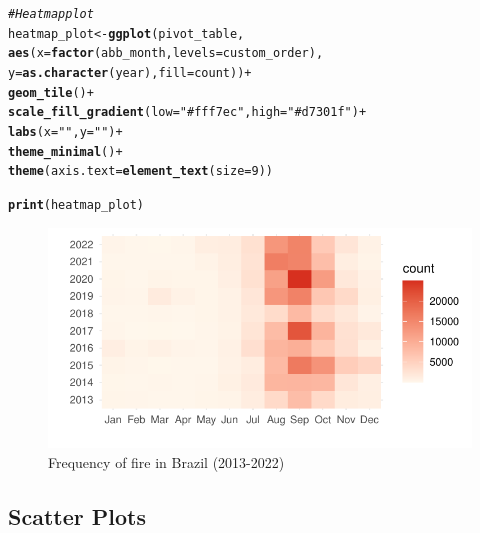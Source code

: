 \documentclass{article}\usepackage[]{graphicx}\usepackage[]{xcolor}
\makeatletter
\def\maxwidth{ %
  \ifdim\Gin@nat@width>\linewidth
    \linewidth
  \else
    \Gin@nat@width
  \fi
}
\newcommand{\hlnum}[1]{\textcolor[rgb]{0.686,0.059,0.569}{#1}}%
\newcommand{\hlstr}[1]{\textcolor[rgb]{0.192,0.494,0.8}{#1}}%
\newcommand{\hlcom}[1]{\textcolor[rgb]{0.678,0.584,0.686}{\textit{#1}}}%
\newcommand{\hlopt}[1]{\textcolor[rgb]{0,0,0}{#1}}%
\newcommand{\hlstd}[1]{\textcolor[rgb]{0.345,0.345,0.345}{#1}}%
\newcommand{\hlkwb}[1]{\textcolor[rgb]{0.69,0.353,0.396}{#1}}%
\newcommand{\hlkwc}[1]{\textcolor[rgb]{0.333,0.667,0.333}{#1}}%
\newcommand{\hlkwd}[1]{\textcolor[rgb]{0.737,0.353,0.396}{\textbf{#1}}}%
\newenvironment{kframe}{%
 \def\at@end@of@kframe{}%
 \ifinner\ifhmode%
  \def\at@end@of@kframe{\end{minipage}}%
  \begin{minipage}{\columnwidth}%
 \fi\fi%
 \def\FrameCommand##1{\hskip\@totalleftmargin \hskip-\fboxsep
 \colorbox{shadecolor}{##1}\hskip-\fboxsep
     \hskip-\linewidth \hskip-\@totalleftmargin \hskip\columnwidth}%
 \MakeFramed {\advance\hsize-\width
   \@totalleftmargin\z@ \linewidth\hsize
   \@setminipage}}%
 {\par\unskip\endMakeFramed%
 \at@end@of@kframe}
\newenvironment{knitrout}{}{} %
\numberwithin{equation}{section}
\makeatother
\begin{document}
\begin{knitrout}\scriptsize
{}\color{fgcolor}\begin{kframe}
\begin{alltt}
\hlcom{# Heatmap plot}
\hlstd{heatmap_plot} \hlkwb{<-} \hlkwd{ggplot}\hlstd{(pivot_table,}
                       \hlkwd{aes}\hlstd{(}\hlkwc{x} \hlstd{=} \hlkwd{factor}\hlstd{(abb_month,} \hlkwc{levels} \hlstd{= custom_order),}
                           \hlkwc{y} \hlstd{=} \hlkwd{as.character}\hlstd{(year),} \hlkwc{fill} \hlstd{= count))} \hlopt{+}
  \hlkwd{geom_tile}\hlstd{()} \hlopt{+}
  \hlkwd{scale_fill_gradient}\hlstd{(}\hlkwc{low} \hlstd{=} \hlstr{"#fff7ec"}\hlstd{,} \hlkwc{high} \hlstd{=} \hlstr{"#d7301f"}\hlstd{)} \hlopt{+}
  \hlkwd{labs}\hlstd{(}\hlkwc{x} \hlstd{=} \hlstr{" "}\hlstd{,} \hlkwc{y} \hlstd{=} \hlstr{" "}\hlstd{)} \hlopt{+}
  \hlkwd{theme_minimal}\hlstd{()} \hlopt{+}
  \hlkwd{theme}\hlstd{(}\hlkwc{axis.text} \hlstd{=} \hlkwd{element_text}\hlstd{(}\hlkwc{size} \hlstd{=} \hlnum{9}\hlstd{))}

\hlkwd{print}\hlstd{(heatmap_plot)}
\end{alltt}
\end{kframe}\begin{figure}[H]

{\centering \includegraphics[width=\maxwidth]{figure/beamer-fire-by-months-fy13-22-1} 

}

\caption[Frequency of fire in Brazil (2013-2022)]{Frequency of fire in Brazil (2013-2022)}\label{fig:fire-by-months-fy13-22}
\end{figure}

\end{knitrout}

\subsection{Scatter Plots}
\end{document}
